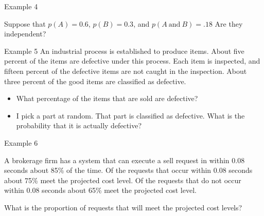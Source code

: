 \begin{frame}{Example 4}

  Suppose that $p(A)=0.6$, $p(B)=0.3$, and $p(A\mathrm{~and~}B)=.18$
  Are they independent?

  \vfill

  
\end{frame}


\begin{frame}{Example 5}
  An industrial process is established to produce items. About five
  percent of the items are defective under this process. Each item is
  inspected, and fifteen percent of the defective items are not caught
  in the inspection. About three percent of the good items are
  classified as defective.

  \begin{itemize}
  \item What percentage of the items that are sold are defective?
  \item I pick a part at random. That part is classified as
    defective. What is the probability that it is actually defective?
  \end{itemize}

  \vfill

\end{frame}


\begin{frame}{Example 6}

  A brokerage firm has a system that can execute a sell request in
  within 0.08 seconds about 85\% of the time. Of the requests that
  occur within 0.08 seconds about 75\% meet the projected cost
  level. Of the requests that do not occur within 0.08 seconds about
  65\% meet the projected cost level.

  What is the proportion of requests that will meet the projected cost
  levels?

  \vfill
  
\end{frame}




